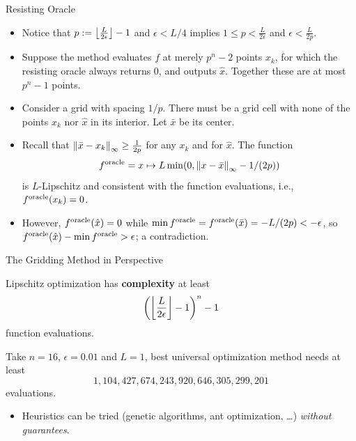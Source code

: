 \documentclass[9pt]{beamer}
\begin{document}
\begin{frame}{Resisting Oracle}
  \begin{itemize}
  \item Notice that $p \defn \floor{\frac{L}{2\epsilon}}-1$ and $\epsilon<L/4$ implies $1\leq p<\frac{L}{2\epsilon}$ and $\epsilon<\frac{L}{2p}$. 
  \item<2-> Suppose the method evaluates $f$ at merely $p^n-2$ points $x_k$, for which the resisting oracle always returns $0$, and outputs $\hat x$. Together these are at most $p^n-1$ points.
  \item<3-> Consider a grid with spacing $1/p$. There must be a grid cell with none of the points $x_k$ nor $\hat x$ in its interior. Let $\bar x$ be its center.
  \item<4-> Recall that $\norm{\bar x -x_k}_\infty\geq \frac{1}{2 p}$ for any $x_k$ and for $\hat x$. The function
    \[
      f^{\rm{oracle}} = x\mapsto L \min(0, \norm{x-\bar x}_\infty-\tfrac{1}{(2 p)})
    \]
    is $L$-Lipschitz and consistent with the function evaluations, i.e., $f^{\rm{oracle}}(x_k)=0$.
  \item<5-> However, $f^{\rm{oracle}}(\hat x)=0$ while $\min f^{\rm{oracle}} = f^{\rm{oracle}}(\bar x) = -\tfrac{L}{(2p)}< -\epsilon$, so $f^{\rm{oracle}}(\hat x)-\min f^{\rm{oracle}}>\epsilon$; a contradiction. 
  \end{itemize}
  
\end{frame}

\begin{frame}{The Gridding Method in Perspective}

  Lipschitz optimization has \textbf{complexity} at least $$\left(\floor{\frac{L}{2\epsilon}}-1\right)^n-1$$ function evaluations.
  
  \vfill
  
  Take $n=16$, $\epsilon=0.01$ and $L=1$, best universal optimization method needs at least
  \[
    1,104,427,674,243,920,646,305,299,201
  \]
  evaluations.

  \vfill

  \begin{itemize}
  \item Heuristics can be tried (genetic algorithms, ant optimization, \dots) \emph{without guarantees}.
  \end{itemize}
  
\end{frame}
\end{document}
